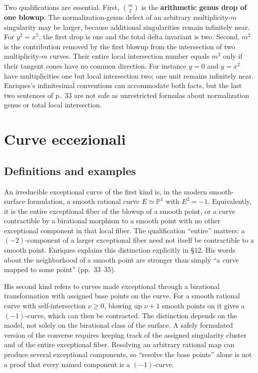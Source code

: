Two qualifications are essential. First, \(\binom m2\) is the \textbf{arithmetic genus drop of one blowup}. The normalization-genus defect of an arbitrary multiplicity-\(m\) singularity may be larger, because additional singularities remain infinitely near. For \(y^2=x^5\), the first drop is one and the total delta invariant is two. Second, \(m^2\) is the contribution removed by the first blowup from the intersection of two multiplicity-\(m\) curves. Their entire local intersection number equals \(m^2\) only if their tangent cones have no common direction. For instance \(y=0\) and \(y=x^2\) have multiplicities one but local intersection two; one unit remains infinitely near. Enriques's infinitesimal conventions can accommodate both facts, but the last two sentences of p.~33 are not safe as unrestricted formulas about normalization genus or total local intersection.

\section{Curve eccezionali}
\label{enriques-I-11}

\subsection{Definitions and examples}

An irreducible exceptional curve of the first kind is, in the modern smooth-surface formulation, a smooth rational curve \(E\simeq\mathbb P^1\) with \(E^2=-1\). Equivalently, it is the entire exceptional fiber of the blowup of a smooth point, or a curve contractible by a birational morphism to a smooth point with no other exceptional component in that local fiber. The qualification ``entire'' matters: a \((-2)\)-component of a larger exceptional fiber need not itself be contractible to a smooth point. Enriques explains this distinction explicitly in §12. His words about the neighborhood of a smooth point are stronger than simply ``a curve mapped to some point'' (pp.~33--35).

His second kind refers to curves made exceptional through a birational transformation with assigned base points on the curve. For a smooth rational curve with self-intersection \(\nu\ge0\), blowing up \(\nu+1\) smooth points on it gives a \((-1)\)-curve, which can then be contracted. The distinction depends on the model, not solely on the birational class of the surface. A safely formulated version of the converse requires keeping track of the assigned singularity cluster and of the entire exceptional fiber. Resolving an arbitrary rational map can produce several exceptional components, so ``resolve the base points'' alone is not a proof that every named component is a \((-1)\)-curve.

